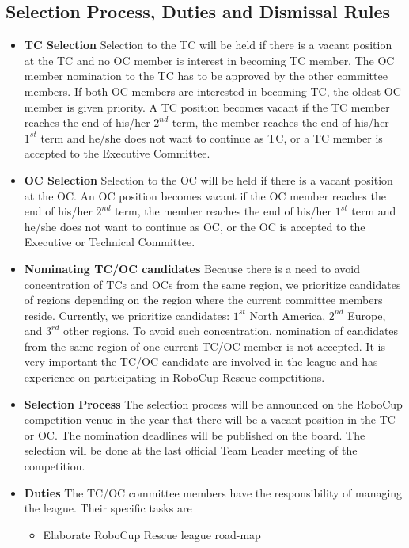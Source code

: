 \documentclass{article}
\begin{document}
\subsection{Selection Process, Duties and Dismissal Rules}
\begin{itemize}
  \item \textbf{TC Selection} Selection to the TC will be held if there is a
  vacant position at the TC and no OC member is interest in becoming TC member.
  The OC member nomination to the TC has to be approved by the other committee
  members. If both OC members are interested in becoming TC, the oldest OC
  member is given priority. A TC position becomes vacant if the TC member
  reaches the end of his/her $2^{nd}$ term, the member reaches the end of
  his/her $1^{st}$ term and he/she does not want to continue as TC, or a TC
  member is accepted to the Executive Committee.
  \item \textbf{OC Selection} Selection to the OC will be held if there is a
  vacant position at the OC. An OC position becomes vacant if the OC member
  reaches the end of his/her $2^{nd}$ term, the member reaches the end of
  his/her $1^{st}$ term and he/she does not want to continue as OC, or the OC is
  accepted to the Executive or Technical Committee.
  \item \textbf{Nominating TC/OC candidates} Because there is a need to avoid
  concentration of TCs and OCs from the same region, we prioritize candidates
  of regions depending on the region where the current committee members reside.
  Currently, we prioritize candidates: $1^{st}$ North America, $2^{nd}$ Europe,
  and $3^{rd}$ other regions. To avoid such concentration, nomination of
  candidates from the same region of one current TC/OC member is not accepted.
  It is very important the TC/OC candidate are involved in the league and has
  experience on participating in RoboCup Rescue competitions.
  \item \textbf{Selection Process} The selection process will be announced on
  the RoboCup competition venue in the year that there will be a vacant position
  in the TC or OC. The nomination deadlines will be published on the board. The
  selection will be done at the last official Team Leader meeting of the
  competition.
  \item \textbf{Duties} The TC/OC committee members have the responsibility of
  managing the league. Their specific tasks are
  \begin{itemize}
    \item Elaborate RoboCup Rescue league road-map

\end{itemize}
\end{itemize}
\end{document}
